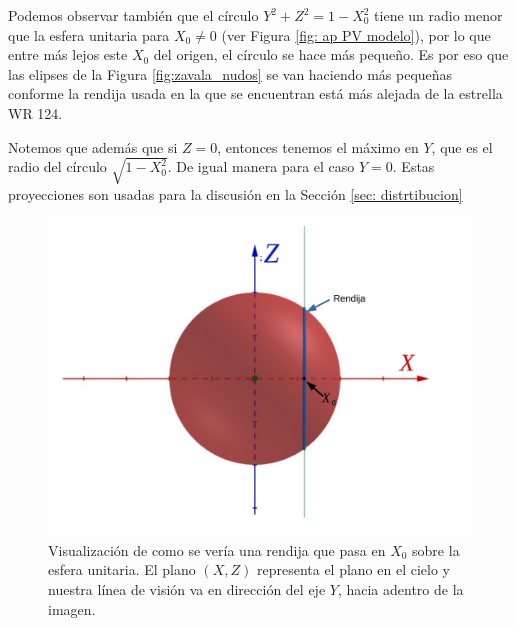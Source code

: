 \documentclass{book}
\begin{document}

Podemos observar también que el círculo $Y^2+Z^2=1-X_0^2$ tiene un radio menor que la esfera unitaria  para $X_0\neq0$ (ver Figura \ref{fig: ap PV modelo}), por lo que entre más lejos este $X_0$ del origen, el círculo se hace más pequeño. Es por eso que las elipses de la Figura \ref{fig:zavala_nudos} se van haciendo más pequeñas conforme la rendija usada en la que se encuentran está más alejada de la estrella WR 124. 

Notemos que además que si $Z=0$, entonces tenemos el máximo en $Y$, que es el radio del círculo $\sqrt{1-X_0^2}$.
De igual manera para el caso $Y=0$. Estas proyecciones son usadas para la discusión en la Sección \ref{sec: distrtibucion}

\begin{figure}
    \centering
    \includegraphics[width=\textwidth]{imagenes_corregidas/PV 01.pdf}
    \caption{Visualización de como se vería una rendija que pasa en $X_0$ sobre la esfera unitaria. El plano $(X,Z)$ representa el plano en el cielo y nuestra línea de visión va en dirección del eje $Y$, hacia adentro de la imagen.}
    \label{fig: ap PV rendija}
\end{figure}
\end{document}
